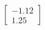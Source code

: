 \documentclass[preview]{standalone}
\begin{document}
\begin{align*}
\begin{bmatrix} -1.12 \\ 1.25 \end{bmatrix}
\end{align*}
\end{document}
